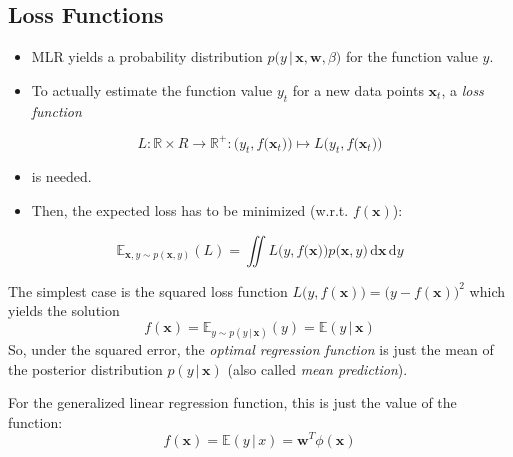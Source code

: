 \documentclass[a4paper, 11pt, accentcolor = tud3b]{tudreport}
\newcommand{\E}{\ensuremath{\mathbb{E}}}
\newcommand{\given}{\ensuremath{\,\vert\,}}
\newcommand{\R}{\ensuremath{\mathbb{R}}}
\newcommand{\dif}[1]{\ensuremath{\,\mathrm{d}#1}}
\renewcommand{\vec}[1]{\mathbf{#1}}
\begin{document}
			\subsection{Loss Functions}
				\begin{itemize}
					\item MLR yields a probability distribution \( p\big(y \given \vec{x}, \vec{w}, \beta\big) \) for the function value \(y\).
					\item To actually estimate the function value \(y_t\) for a new data points \(\vec{x}_t\), a \emph{loss function}
				\end{itemize}
				\begin{equation}
					L : \R \times R \to \R^+ : \Big(y_t, f\big(\vec{x}_t\big)\Big) \mapsto L\Big(y_t, f\big(\vec{x}_t\big)\Big)
				\end{equation}
				\begin{itemize}
					\item[] is needed.
					\item Then, the expected loss has to be minimized (w.r.t. \(f(\vec{x})\)):
				\end{itemize}
				\begin{equation}
					\E_{\vec{x}, y \sim p(\vec{x}, y)}(L) = \iint L\Big(y, f\big(\vec{x}\big)\Big) p\big(\vec{x}, y\big) \dif{\vec{x}} \dif{y}
				\end{equation}

				The simplest case is the squared loss function \( L\big(y, f(\vec{x})\big) = \big(y - f(\vec{x})\big)^2 \) which yields the solution
				\begin{equation}
					f(\vec{x}) = \E_{y \sim p(y \given \vec{x})} (y) = \E(y \given \vec{x})
				\end{equation}
				So, under the squared error, the \emph{optimal regression function} is just the mean of the posterior distribution \( p(y \given \vec{x}) \) (also called \emph{mean prediction}).

				For the generalized linear regression function, this is just the value of the function:
				\begin{equation*}
					f(\vec{x}) = \E(y \given x) = \vec{w}^T \phi(\vec{x})
				\end{equation*}
\end{document}
